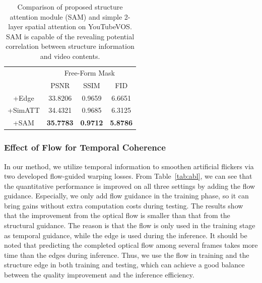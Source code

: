 \begin{table}[t]
	\caption{Comparison of proposed structure attention module (SAM) and simple 2-layer spatial attention on YouTubeVOS. SAM is capable of the revealing potential correlation between structure information and video contents. }\smallskip
	\scriptsize
	\centering
	{
		\smallskip\begin{tabular}{c|c|c|c}
			\hline
			&\multicolumn{3}{c}{Free-Form Mask} \\
			\cline{2-4} 
			& PSNR & SSIM & FID\\
			
			\hline
			+Edge  &33.8206    &0.9659  &    6.6651 \\
			\hline
			
			+SimATT &34.4321    &0.9685  &   6.3125 \\
			
			\hline
			
			+SAM &\textbf{35.7783}    &\textbf{0.9712}  &   \textbf{5.8786}\\
			\hline
			
		
			
			
		\end{tabular}
	}
	\label{tab:sam_com}
\end{table}





\subsubsection{Effect of Flow for Temporal Coherence}

In our method, we utilize temporal information to smoothen artificial flickers via two developed flow-guided warping losses. 
From Table~\ref{tab:abl}, we can see that the quantitative performance is improved on all three settings by adding the flow guidance. Especially, we only add flow guidance in the training phase, so it can bring gains without extra computation costs during testing.
The results show that the improvement from the optical flow is smaller than that from the structural guidance.
The reason is that the flow is only used in the training stage as temporal guidance, while the edge is used during the inference.
It should be noted that predicting the completed optical flow among several frames takes more time than the edges during inference.
Thus, we use the flow in training and the structure edge in both training and testing, which can achieve a good balance between the quality improvement and the inference efficiency. 


